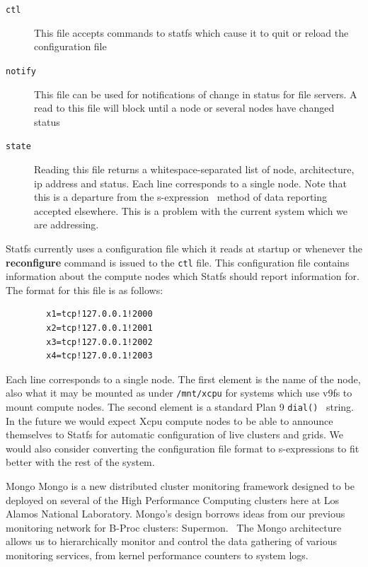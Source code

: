 \documentclass[11pt]{p9article}
\makeatletter
\renewcommand\subsection{\@startsection {subsection}{1}{\z@} {3pt} {1pt} {\normalfont\normalsize\bfseries}}
\makeatother
\begin{document}
\begin{description} 
\item [\texttt{ctl}] This file accepts commands to statfs which cause it to quit or
reload the configuration file
\item [\texttt{notify}] This file can be used for notifications of
change in status for file servers. A read to this file will block
until a node or several nodes have changed status
\item [\texttt{state}] Reading this file returns a whitespace-separated
list of node, architecture, ip address and status. Each line
corresponds to a single node. Note that this is a departure from
the s-expression~\cite{sexpr} method of data reporting accepted elsewhere. This
is a problem with the current system which we are addressing.
\end{description} 

Statfs currently uses a configuration file which
it reads at startup or whenever the \textbf{reconfigure} command
is issued to the \texttt{ctl} file. This configuration file contains
information about the compute nodes which Statfs should report
information for. The format for this file is as follows:
\begin{verbatim}
        x1=tcp!127.0.0.1!2000
        x2=tcp!127.0.0.1!2001
        x3=tcp!127.0.0.1!2002
        x4=tcp!127.0.0.1!2003
\end{verbatim}
Each line corresponds to a single node. The first element is the
name of the node, also what it may be mounted as under \texttt{/mnt/xcpu}
for systems which use v9fs to mount compute nodes. The second element
is a standard Plan 9 \texttt{dial()}~\cite{presottonetworks} string.
In the future we would expect Xcpu compute nodes to be able to
announce themselves to Statfs for automatic configuration of live
clusters and grids. We would also consider converting the configuration
file format to s-expressions to fit better with the rest of the
system.


\subsection{Mongo}
Mongo is a new distributed cluster monitoring framework designed
to be deployed on several of the High Performance Computing clusters
here at Los Alamos National Laboratory. Mongo's design borrows ideas
from our previous monitoring network for B-Proc clusters:
Supermon.~\cite{supermon} The Mongo architecture allows us to
hierarchically monitor and control the data gathering of various
monitoring services, from kernel performance counters to system
logs.
\end{document}
